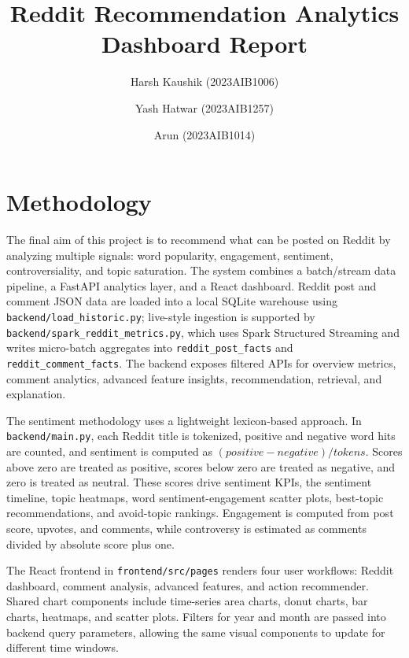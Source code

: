 \documentclass[10pt,twocolumn]{article}
\begin{document}
\title{\vspace{-1.0cm}\textbf{Reddit Recommendation Analytics Dashboard Report}}
\author{Harsh Kaushik (2023AIB1006) \and Yash Hatwar (2023AIB1257) \and Arun (2023AIB1014)}
\date{}
\maketitle
\vspace{-0.65cm}

\section{Methodology}
The final aim of this project is to recommend what can be posted on Reddit by analyzing multiple signals: word popularity, engagement, sentiment, controversiality, and topic saturation. The system combines a batch/stream data pipeline, a FastAPI analytics layer, and a React dashboard. Reddit post and comment JSON data are loaded into a local SQLite warehouse using \texttt{backend/load\_historic.py}; live-style ingestion is supported by \texttt{backend/spark\_reddit\_metrics.py}, which uses Spark Structured Streaming and writes micro-batch aggregates into \texttt{reddit\_post\_facts} and \texttt{reddit\_comment\_facts}. The backend exposes filtered APIs for overview metrics, comment analytics, advanced feature insights, recommendation, retrieval, and explanation.

The sentiment methodology uses a lightweight lexicon-based approach. In \texttt{backend/main.py}, each Reddit title is tokenized, positive and negative word hits are counted, and sentiment is computed as \((positive-negative)/tokens\). Scores above zero are treated as positive, scores below zero are treated as negative, and zero is treated as neutral. These scores drive sentiment KPIs, the sentiment timeline, topic heatmaps, word sentiment-engagement scatter plots, best-topic recommendations, and avoid-topic rankings. Engagement is computed from post score, upvotes, and comments, while controversy is estimated as comments divided by absolute score plus one.

The React frontend in \texttt{frontend/src/pages} renders four user workflows: Reddit dashboard, comment analysis, advanced features, and action recommender. Shared chart components include time-series area charts, donut charts, bar charts, heatmaps, and scatter plots. Filters for year and month are passed into backend query parameters, allowing the same visual components to update for different time windows.
\end{document}
